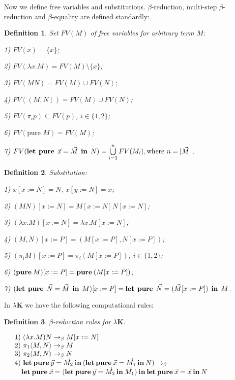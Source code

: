 \documentclass[a4paper]{article}
\newtheorem{defin}{Definition}
\begin{document}
  \vspace{\baselineskip}

  Now we define free variables and substitutions. $\beta$-reduction, multi-step $\beta$-reduction and $\beta$-equality are defined standardly:

  \begin{defin} Set $FV(M)$ of free variables for arbitrary term $M$:

  1) $FV(x) = \{ x \}$;

  2) $FV(\lambda x. M) = FV(M) \setminus \{ x\}$;

  3) $FV(M N) = FV(M) \cup FV(N);$

  4) $FV((M,N)) = FV(M) \cup FV(N)$;

  5) $FV(\pi_i p) \subseteq FV(p)$, $i \in \{ 1, 2\}$;

  6) $FV(\text{pure } M) = FV(M)$;

  7) $FV({\bf let \:\: pure} \:\: \vec{x} = \vec{M} \:\: {\bf in} \:\: N) = \bigcup \limits_{i = 1}^n FV(M_i), \text{where $n = |\vec{M}|$}$.
  \end{defin}

  \begin{defin} Substitution:

  1) $x [x := N] = N$, $x [y := N] = x$;

  2) $(M N) [x := N] = M[x := N] N [x := N]$;

  3) $(\lambda x. M) [x := N] = \lambda x. M [x := N]$;

  4) $(M, N)[x := P] = (M[x := P], N [x := P])$;

  5) $(\pi_i M) [x := P] = \pi_i (M[x := P])$, $i \in \{ 1, 2\}$;

  6) $({\bf pure \: } M) [x := P] = {\bf pure \: } (M [x := P])$;

  7) $({\bf let \:\: pure} \:\: \vec{N} = \vec{M} \:\: {\bf in} \:\: M) [x := P] = {\bf let \:\: pure} \:\: \vec{N} = (\vec{M} [x := P]) \:\: {\bf in} \:\: M$.
  \end{defin}

  In $\lambda \textbf{K}$ we have the following computational rules:

  \begin{defin} $\beta$-reduction rules for \emph{$\lambda \textbf{K}$}.

$\begin{array}{lll}
&\text{1) } (\lambda x. M) N \rightarrow_{\beta} M [x := N]& \\
&\text{2) } \pi_1 \langle M, N \rangle \rightarrow_{\beta} M& \\
&\text{3) } \pi_2 \langle M, N \rangle \rightarrow_{\beta} N& \\
&\text{4) } {\bf let \: pure \: } \vec{y} = \vec{M_2} {\bf \: in \: } ({\bf let \: pure \: } \vec{x} = \vec{M_1} {\bf \: in \: }  N) \rightarrow_{\beta}& \\
&\quad {\bf let \: pure \: } \vec{x} = ({\bf let \: pure \: } \vec{y} = \vec{M_2} \: {\bf in} \: \vec{M_1}) \: {\bf in} \: {\bf let \: pure \: } \vec{x} = \vec{x} {\bf \: in \:} N&
\end{array}$

  \end{defin}
\end{document}
